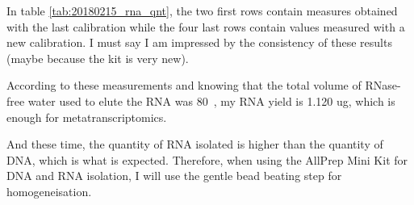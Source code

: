 In table \ref{tab:20180215_rna_qnt}, the two first rows contain measures obtained with the last calibration while the four last rows contain values measured with a new calibration. I must say I am impressed by the consistency of these results (maybe because the kit is very new). 

According to these measurements and knowing that the total volume of RNase-free water used to elute the RNA was 80~\uL, my RNA yield is 1.120 ug, which is enough for metatranscriptomics. 

And these time, the quantity of RNA isolated is higher than the quantity of DNA, which is what is expected. Therefore, when using the AllPrep Mini Kit for DNA and RNA isolation, I will use the gentle bead beating step for homogeneisation.

